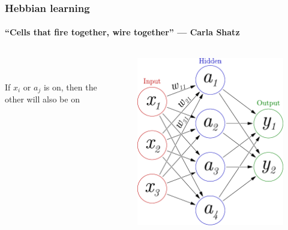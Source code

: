 \documentclass{beamer}
\begin{document}
\begin{frame}
\frametitle{Hebbian learning}
\framesubtitle{``Cells that fire together, wire together'' --- Carla Shatz }
  \begin{columns}[T]
    \begin{column}{.5\textwidth}
    \ \\ 
        {      \ \\ 

      If $x_i$ or $a_j$ is on, then the other will also be on}

    \end{column}
    \begin{column}{.5\textwidth}
\begin{figure}
 
 \includegraphics[width=\linewidth]{./fig/3-layer_maths.pdf}
\end{figure}
    \end{column}
  \end{columns}
\end{frame}
\end{document}
